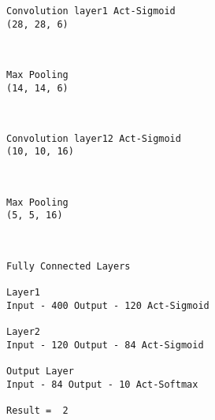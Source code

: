 \documentclass[11pt]{article}
\begin{document}
    \begin{Verbatim}[commandchars=\\\{\}]
Convolution layer1 Act-Sigmoid
(28, 28, 6)

    \end{Verbatim}

    \begin{center}
    \end{center}
    { \hspace*{\fill} \\}
    
    \begin{Verbatim}[commandchars=\\\{\}]
Max Pooling
(14, 14, 6)

    \end{Verbatim}

    \begin{center}
    \end{center}
    { \hspace*{\fill} \\}
    
    \begin{Verbatim}[commandchars=\\\{\}]
Convolution layer12 Act-Sigmoid
(10, 10, 16)

    \end{Verbatim}

    \begin{center}
    \end{center}
    { \hspace*{\fill} \\}
    
    \begin{Verbatim}[commandchars=\\\{\}]
Max Pooling
(5, 5, 16)

    \end{Verbatim}

    \begin{center}
    \end{center}
    { \hspace*{\fill} \\}
    
    \begin{Verbatim}[commandchars=\\\{\}]
Fully Connected Layers

Layer1
Input - 400 Output - 120 Act-Sigmoid

Layer2
Input - 120 Output - 84 Act-Sigmoid

Output Layer
Input - 84 Output - 10 Act-Softmax

Result =  2

    \end{Verbatim}
\end{document}
